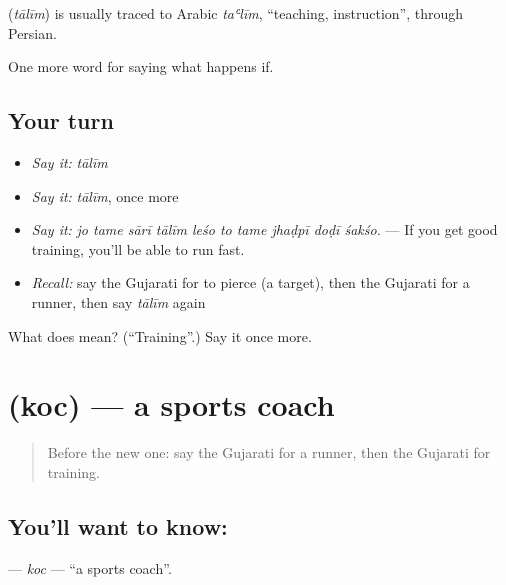 \begin{cousinweb}
\textbf{} (\emph{tālīm}) is usually traced to Arabic \emph{taʿlīm}, \textquotedblleft{}teaching, instruction\textquotedblright{}, through Persian.
\end{cousinweb}

\begin{grammarlens}[title={What you've built}]
One more word for saying what happens if.
\end{grammarlens}

\subsection*{Your turn}
\begin{itemize}
\raggedright
  \item \emph{Say it:} \emph{tālīm}
  \item \emph{Say it:} \emph{tālīm}, once more
  \item \emph{Say it:} \emph{jo tame sārī tālīm leśo to tame jhaḍpī doḍī śakśo.} — If you get good training, you'll be able to run fast.
  \item \emph{Recall:} say the Gujarati for to pierce (a target), then the Gujarati for a runner, then say \emph{tālīm} again
\end{itemize}

\begin{tcolorbox}[breakable,colback=teal!4,colframe=teal!35!black,title={Before you move on}]
What does  mean? (\textquotedblleft{}Training\textquotedblright{}.) Say it once more.
\end{tcolorbox}
\section[\texorpdfstring{\gu{કોચ} (koc)}{કોચ (koc)}]{ (koc) — a sports coach}

\label{lesson:GU-C551-koc}



\begin{quote}
Before the new one: say the Gujarati for a runner, then the Gujarati for training.
\end{quote}

\subsection*{You'll want to know: }
\textbf{} — \emph{koc} — \textquotedblleft{}a sports coach\textquotedblright{}.

